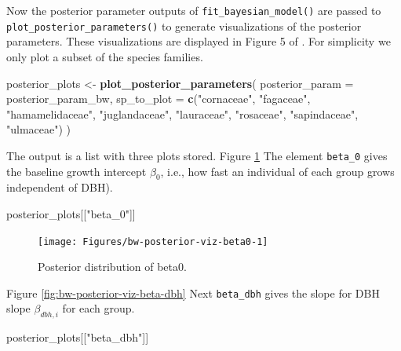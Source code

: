 \documentclass[12pt]{article}
\newenvironment{Shaded}{\begin{snugshade}}{\end{snugshade}}
\newcommand{\DataTypeTok}[1]{\textcolor[rgb]{0.13,0.29,0.53}{#1}}
\newcommand{\KeywordTok}[1]{\textcolor[rgb]{0.13,0.29,0.53}{\textbf{#1}}}
\newcommand{\NormalTok}[1]{#1}
\newcommand{\StringTok}[1]{\textcolor[rgb]{0.31,0.60,0.02}{#1}}
\begin{document}
Now the posterior parameter outputs of \texttt{fit\_bayesian\_model()}
are passed to \texttt{plot\_posterior\_parameters()} to generate
visualizations of the posterior parameters. These visualizations are
displayed in Figure 5 of \citet{allen_permutation_2020}. For simplicity
we only plot a subset of the species families.

\begin{Shaded}
\begin{Highlighting}[]
\NormalTok{posterior_plots <-}\StringTok{ }\KeywordTok{plot_posterior_parameters}\NormalTok{(}
  \DataTypeTok{posterior_param =}\NormalTok{ posterior_param_bw,}
  \DataTypeTok{sp_to_plot =} \KeywordTok{c}\NormalTok{(}\StringTok{"cornaceae"}\NormalTok{, }\StringTok{"fagaceae"}\NormalTok{, }\StringTok{"hamamelidaceae"}\NormalTok{, }\StringTok{"juglandaceae"}\NormalTok{, }
                 \StringTok{"lauraceae"}\NormalTok{, }\StringTok{"rosaceae"}\NormalTok{, }\StringTok{"sapindaceae"}\NormalTok{, }\StringTok{"ulmaceae"}\NormalTok{)}
\NormalTok{)}
\end{Highlighting}
\end{Shaded}

The output is a list with three plots stored. Figure
\ref{fig:bw-posterior-viz-beta0} The element \texttt{beta\_0} gives the
baseline growth intercept \(\beta_0\), i.e., how fast an individual of
each group grows independent of DBH).

\begin{Shaded}
\begin{Highlighting}[]
\NormalTok{posterior_plots[[}\StringTok{"beta_0"}\NormalTok{]]}
\end{Highlighting}
\end{Shaded}

\begin{figure}

{\centering \texttt{[image: Figures/bw-posterior-viz-beta0-1]} 

}

\caption{Posterior distribution of beta0.}\label{fig:bw-posterior-viz-beta0}
\end{figure}

Figure \ref{fig:bw-posterior-viz-beta-dbh} Next \texttt{beta\_dbh} gives
the slope for DBH slope \(\beta_{dbh,i}\) for each group.

\begin{Shaded}
\begin{Highlighting}[]
\NormalTok{posterior_plots[[}\StringTok{"beta_dbh"}\NormalTok{]]}
\end{Highlighting}
\end{Shaded}
\end{document}
